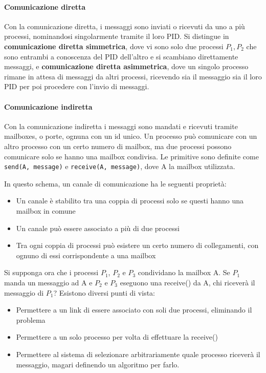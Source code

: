 \documentclass[a4]{article}
\begin{document}
\paragraph{Comunicazione diretta}
Con la comunicazione diretta, i messaggi sono inviati o ricevuti da uno a più processi, nominandosi singolarmente tramite il loro PID. Si distingue in \textbf{comunicazione diretta simmetrica}, dove vi sono solo due processi $P_1, P_2$ che sono entrambi a conoscenza del PID dell'altro e si scambiano direttamente messaggi, e \textbf{comunicazione diretta asimmetrica}, dove un singolo processo rimane in attesa di messaggi da altri processi, ricevendo sia il messaggio sia il loro PID per poi procedere con l'invio di messaggi.

\paragraph{Comunicazione indiretta}
Con la comunicazione indiretta i messaggi sono mandati e ricevuti tramite mailboxes, o porte, ognuna con un id unico. Un processo può comunicare con un altro processo con un certo numero di mailbox, ma due processi possono comunicare solo se hanno una mailbox condivisa. Le primitive sono definite come \texttt{send(A, message)} e \texttt{receive(A, message)}, dove A la mailbox utilizzata.

In questo schema, un canale di comunicazione ha le seguenti proprietà:
\begin{itemize}
    \item Un canale è stabilito tra una coppia di processi solo se questi hanno una mailbox in comune
    \item Un canale può essere associato a più di due processi
    \item Tra ogni coppia di processi può esistere un certo numero di collegamenti, con ognuno di essi corrispondente a una mailbox
\end{itemize}

Si supponga ora che i processi $P_1$, $P_2$ e $P_3$ condividano la mailbox A. Se $P_1$ manda un messaggio ad A e $P_2$ e $P_3$ eseguono una receive() da A, chi riceverà il messaggio di $P_1$? Esistono diversi punti di vista:
\begin{itemize}
    \item Permettere a un link di essere associato con soli due processi, eliminando il problema
    \item Permettere a un solo processo per volta di effettuare la receive()
    \item Permettere al sistema di selezionare arbitrariamente quale processo riceverà il messaggio, magari definendo un algoritmo per farlo.
\end{itemize}
\end{document}
